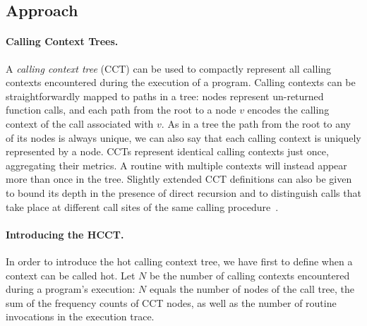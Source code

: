 

\subsection{Approach}
\label{ss:hcct-approach}

\paragraph*{Calling Context Trees.} A {\em calling context tree} (CCT) can be used to compactly represent all calling contexts encountered during the execution of a program. Calling contexts can be straightforwardly mapped to paths in a tree: nodes represent un-returned function calls, and each path from the root to a node $v$ encodes the calling context of the call associated with $v$. As in a tree the path from the root to any of its nodes is always unique, we can also say that each calling context is uniquely represented by a node. CCTs represent identical calling contexts just once, aggregating their metrics. A routine with multiple contexts will instead appear more than once in the tree. Slightly extended CCT definitions can also be given to bound its depth in the presence of direct recursion and to distinguish calls that take place at different call sites of the same calling procedure~\cite{Ammons97}.


\paragraph*{Introducing the HCCT.} In order to introduce the hot calling context tree, we have first to define when a context can be called hot. Let $N$ be the number of calling contexts encountered during a program's execution: $N$ equals the number of nodes of the call tree, the sum of the frequency counts of CCT nodes, as well as the number of routine invocations in the execution trace. 

